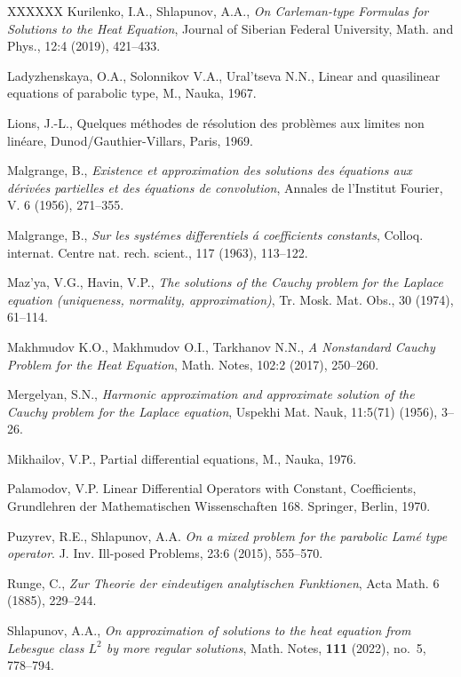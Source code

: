 \documentclass{amsart}
\theoremstyle{definition}
\theoremstyle{remark}
\numberwithin{equation}{section}
\begin{document}
\begin{thebibliography}{XXXXXX}
{Kurilenko, I.A., Shlapunov, A.A.}, 
\textit{On Carleman-type Formulas for Solutions to the Heat Equation}, 
Journal of Siberian Federal University, Math. and Phys.,  12:4 (2019), 421--433.

{Ladyzhenskaya, O.A., Solonnikov V.A., Ural'tseva N.N.},
{Linear and quasilinear equations of parabolic type}, M., Nauka,  1967. 

{Lions, J.-L.}, {Quelques m\'{e}thodes de r\'{e}solution des probl\`{e}mes aux 
limites non lin\'{e}are}, Dunod/Gauthier-Villars, Paris, 1969. 

{Malgrange, B.},  
\textit{Existence et approximation des solutions des \'equations aux d\'eriv\'ees 
partielles et des \'equations de convolution}, Annales de l'Institut Fourier, V. 6 (1956),  271--355. 

{Malgrange, B.},  
\textit{Sur les syst\'emes differentiels \'a coefficients constants}, Colloq. internat. 
Centre nat. rech. scient., 117 (1963),  113--122. 
 
 Maz'ya, V.G., Havin,  V.P.,  
\textit{The solutions of the Cauchy problem for the Laplace equation (uniqueness, normality, 
approximation)}, Tr. Mosk. Mat. Obs., 30 (1974),  61--114.

Makhmudov K.O., Makhmudov O.I.,  Tarkhanov N.N., 
\textit{A Nonstandard Cauchy Problem for the Heat Equation}, 
Math. Notes, 102:2 (2017), 250--260. 

 Mergelyan, S.N., 
\textit{Harmonic approximation and approximate solution of the Cauchy problem for the Laplace 
equation}, Uspekhi Mat. Nauk, 11:5(71) (1956),  3--26. 

{Mikhailov, V.P.}, 
{Partial differential equations}, M., Nauka, 1976. 

Palamodov, V.P. {Linear Differential Operators with Constant}, 
Coefficients, Grund\-leh\-ren der Mathematischen Wissenschaften 168. Springer, Berlin, 1970.

{Puzyrev, R.E., Shlapunov, A.A.} 
\textit{ On a mixed problem for the parabolic Lam\'e type operator}. 
J. Inv. Ill-posed Problems,  23:6 (2015), 555--570.

{Runge, C.}, \textit{Zur Theorie der eindeutigen analytischen Funktionen}, 
Acta Math. 6 (1885), 229--244. 

{Shlapunov, A.A.},
 \textit{On approximation of solutions to the heat 
equation from Lebesgue class $L^2$ by more regular solutions}, 
Math. Notes, {\bf 111} (2022), no.~5, 778--794.


\end{thebibliography}
\end{document}
